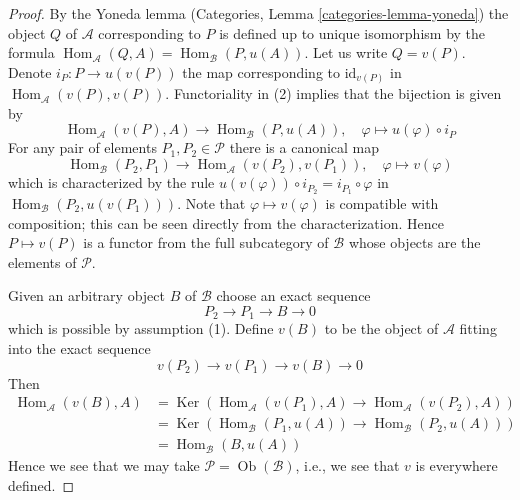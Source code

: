 \documentclass[10pt,a4paper]{amsart}
\theoremstyle{plain}
\theoremstyle{definition}
\theoremstyle{remark}
\numberwithin{equation}{subsection}
\def\Hom{\mathop{\mathrm{Hom}}\nolimits}
\def\Ob{\mathop{\mathrm{Ob}}\nolimits}
\def\Ker{\mathop{\mathrm{Ker}}}
\begin{document}
\begin{proof}
By the Yoneda lemma (Categories, Lemma \ref{categories-lemma-yoneda})
the object $Q$ of $\mathcal{A}$ corresponding to $P$ is defined up to
unique isomorphism by the formula
$\Hom_\mathcal{A}(Q, A) = \Hom_\mathcal{B}(P, u(A))$. Let us write
$Q = v(P)$. Denote $i_P : P \to u(v(P))$ the map corresponding to
$\text{id}_{v(P)}$ in $\Hom_\mathcal{A}(v(P), v(P))$. Functoriality
in (2) implies that the bijection is given by
$$
\Hom_\mathcal{A}(v(P), A) \to \Hom_\mathcal{B}(P, u(A)),\quad
\varphi \mapsto u(\varphi) \circ i_P
$$
For any pair of elements $P_1, P_2 \in \mathcal{P}$ there is a canonical map
$$
\Hom_\mathcal{B}(P_2, P_1)
\to
\Hom_\mathcal{A}(v(P_2), v(P_1)),\quad
\varphi \mapsto v(\varphi)
$$
which is characterized by the rule
$u(v(\varphi)) \circ i_{P_2} = i_{P_1} \circ \varphi$ in
$\Hom_\mathcal{B}(P_2, u(v(P_1)))$.
Note that $\varphi \mapsto v(\varphi)$ is
compatible with composition; this can be seen directly
from the characterization. Hence $P \mapsto v(P)$ is a functor from
the full subcategory of $\mathcal{B}$ whose objects are the elements
of $\mathcal{P}$.

\medskip\noindent
Given an arbitrary object $B$ of $\mathcal{B}$ choose an exact sequence
$$
P_2 \to P_1 \to B \to 0
$$
which is possible by assumption (1). Define $v(B)$ to be the object of
$\mathcal{A}$ fitting into the exact sequence
$$
v(P_2) \to v(P_1) \to v(B) \to 0
$$
Then
\begin{align*}
\Hom_\mathcal{A}(v(B), A)
& =
\Ker(\Hom_\mathcal{A}(v(P_1), A) \to \Hom_\mathcal{A}(v(P_2), A)) \\
& =
\Ker(\Hom_\mathcal{B}(P_1, u(A)) \to \Hom_\mathcal{B}(P_2, u(A))) \\
& =
\Hom_\mathcal{B}(B, u(A))
\end{align*}
Hence we see that we may take $\mathcal{P} = \Ob(\mathcal{B})$, i.e., we
see that $v$ is everywhere defined.
\end{proof}
\end{document}
